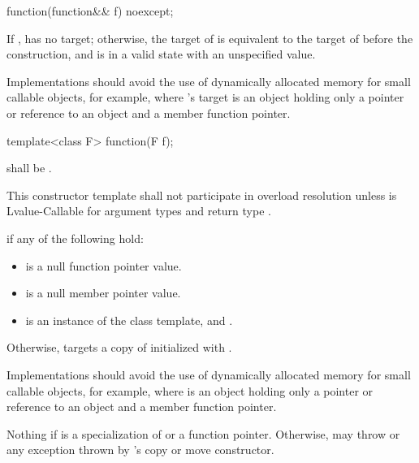 %
\begin{itemdecl}
function(function&& f) noexcept;
\end{itemdecl}

\begin{itemdescr}
\pnum
\ensures
If ,  has no target;
otherwise, the target of  is equivalent to
the target of  before the construction, and
 is in a valid state with an unspecified value.

\pnum
\begin{note}
Implementations should avoid the use of
dynamically allocated memory for small callable objects, for example,
where 's target is an object holding only a pointer or reference
to an object and a member function pointer.
\end{note}
\end{itemdescr}

%
\begin{itemdecl}
template<class F> function(F f);
\end{itemdecl}

\begin{itemdescr}
\pnum
\requires {} shall be .

\pnum
\remarks
This constructor template shall not participate in overload resolution unless
 is Lvalue-Callable for argument types
 and return type .

\pnum
\ensures
{} if any of the following hold:
\begin{itemize}
\item {} is a null function pointer value.
\item {} is a null member pointer value.
\item {} is an instance of the  class template, and
  .
\end{itemize}

\pnum
Otherwise,  targets a copy of 
initialized with .
\begin{note}
Implementations should avoid the use of
dynamically allocated memory for small callable objects, for example,
where  is an object holding only a pointer or
reference to an object and a member function pointer.
\end{note}

\pnum
\throws
Nothing if  is
a specialization of  or
a function pointer. Otherwise, may throw 
or any exception thrown by 's copy or move constructor.
\end{itemdescr}


